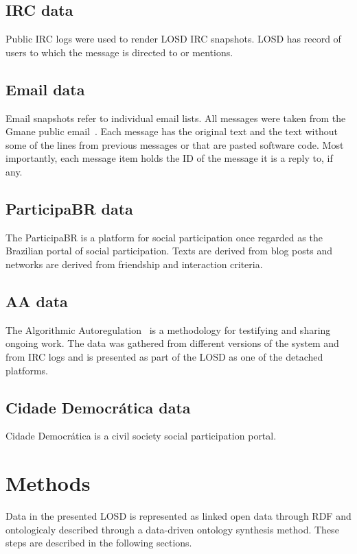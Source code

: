 \documentclass[review]{elsarticle}
\begin{document}
\subsection{IRC data}
Public IRC logs were used to render LOSD IRC snapshots.
LOSD has record of users to which the message is directed to or
mentions.

\subsection{Email data}
Email snapshots refer to individual email lists.
All messages were taken from the Gmane public email~\cite{gmane}.
Each message has the original text and the text without some of the lines
from previous messages or that are pasted software code.
Most importantly, each message item holds the ID of the message it is
a reply to, if any.

\subsection{ParticipaBR data}
The ParticipaBR is a platform for social participation once regarded as
the Brazilian portal of social participation.
Texts are derived from blog posts and networks are derived from
friendship and interaction criteria.

\subsection{AA data}
The Algorithmic Autoregulation~\cite{aa} is a methodology for testifying
and sharing ongoing work.
The data was gathered from different versions of the system and from IRC
logs and is presented as part of the LOSD as one of the detached
platforms.

\subsection{Cidade Democr\'atica data}
Cidade Democr\'atica is a civil society social participation portal.

\section{Methods}
Data in the presented LOSD is represented as linked open data through
RDF and ontologicaly described through a data-driven ontology synthesis
method.
These steps are described in the following sections.
\end{document}

